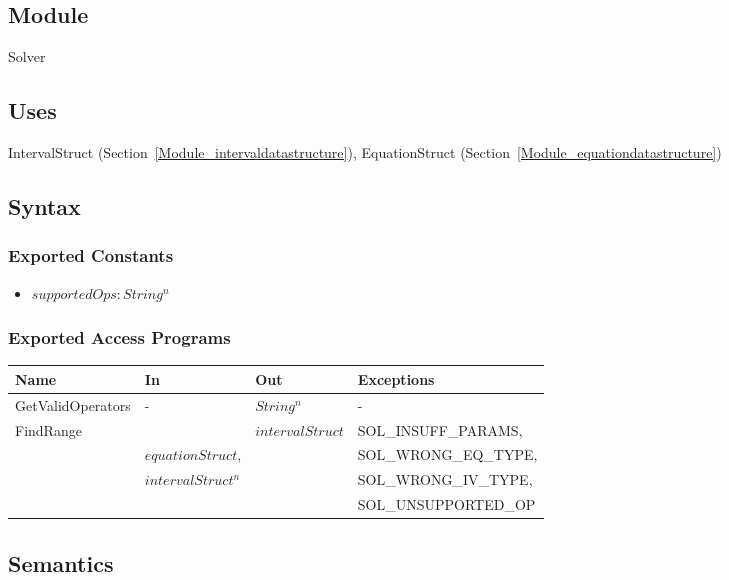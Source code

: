 \documentclass[12pt, titlepage]{article}
\begin{document}
\subsection{Module}

Solver

\subsection{Uses}

IntervalStruct (Section~\ref{Module_intervaldatastructure}), EquationStruct 
(Section~\ref{Module_equationdatastructure})

\subsection{Syntax}

\subsubsection{Exported Constants}

\begin{itemize}
	\item $supportedOps : String^n$
\end{itemize}

\subsubsection{Exported Access Programs}

\begin{center}
	\begin{tabular}{p{3.1cm} p{3cm} p{3cm} p{5cm}}
		\hline
		\textbf{Name} & \textbf{In} & \textbf{Out} & \textbf{Exceptions} \\
		\hline
		GetValidOperators & - & $String^n$ & -\\
		\multirow{4}{3.1cm}{FindRange} &  & 
		\multirow{4}{3.1cm}{$intervalStruct$} & SOL\_INSUFF\_PARAMS,\\
		& $equationStruct$, & & SOL\_WRONG\_EQ\_TYPE,\\
		& $intervalStruct^n$ & & SOL\_WRONG\_IV\_TYPE,\\
		& & & SOL\_UNSUPPORTED\_OP\\
		\hline
	\end{tabular}
\end{center}

\subsection{Semantics}
\end{document}
